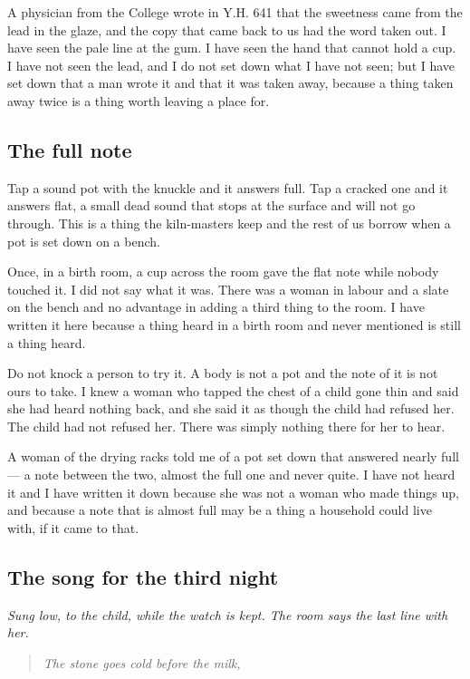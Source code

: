\documentclass{design/chronicle}
\begin{document}
A physician from the College wrote in Y.H. 641 that the sweetness came from the lead in the glaze, and the copy that came back to us had the word taken out. I have seen the pale line at the gum. I have seen the hand that cannot hold a cup. I have not seen the lead, and I do not set down what I have not seen; but I have set down that a man wrote it and that it was taken away, because a thing taken away twice is a thing worth leaving a place for.

\subsection*{The full note}

Tap a sound pot with the knuckle and it answers full. Tap a cracked one and it answers flat, a small dead sound that stops at the surface and will not go through. This is a thing the kiln-masters keep and the rest of us borrow when a pot is set down on a bench.

Once, in a birth room, a cup across the room gave the flat note while nobody touched it. I did not say what it was. There was a woman in labour and a slate on the bench and no advantage in adding a third thing to the room. I have written it here because a thing heard in a birth room and never mentioned is still a thing heard.

Do not knock a person to try it. A body is not a pot and the note of it is not ours to take. I knew a woman who tapped the chest of a child gone thin and said she had heard nothing back, and she said it as though the child had refused her. The child had not refused her. There was simply nothing there for her to hear.

A woman of the drying racks told me of a pot set down that answered nearly full --- a note between the two, almost the full one and never quite. I have not heard it and I have written it down because she was not a woman who made things up, and because a note that is almost full may be a thing a household could live with, if it came to that.

\subsection*{The song for the third night}

\emph{Sung low, to the child, while the watch is kept. The room says the last line with her.}

\begin{quote}\itshape The stone goes cold before the milk,\end{quote}
\end{document}
